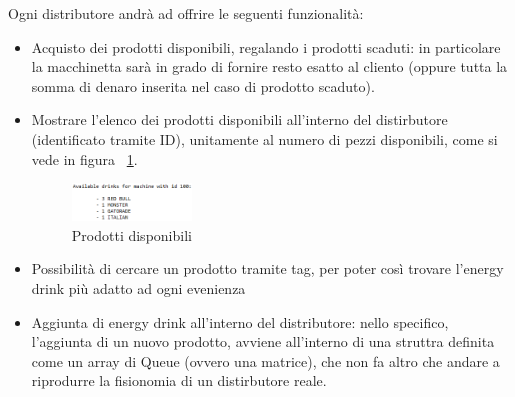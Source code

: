 Ogni distributore andrà ad offrire le seguenti funzionalità:
\begin{itemize}
	\item Acquisto dei prodotti disponibili, regalando i prodotti scaduti: in particolare la macchinetta sarà in grado di fornire resto esatto al cliento (oppure tutta la somma di denaro inserita nel caso di prodotto scaduto).
	\item Mostrare l'elenco dei prodotti disponibili all'interno del distirbutore (identificato tramite ID), unitamente al numero di pezzi disponibili, come si vede in figura ~\ref{fig:AvailableProducts}.
	\begin{figure}[h]
		\centering
		\includegraphics[width=0.3\textwidth]{Immagini/ShowVendingMachine.png}
		\caption{Prodotti disponibili}
		\label{fig:AvailableProducts}
	\end{figure}
	\item Possibilità di cercare un prodotto tramite tag, per poter così trovare l'energy drink più adatto ad ogni evenienza
	\item Aggiunta di energy drink all'interno del distributore: nello specifico, l'aggiunta di un nuovo prodotto, avviene all'interno di una struttra definita come un array di Queue (ovvero una matrice), che non fa altro che andare a riprodurre la fisionomia di un distirbutore reale.
\end{itemize}


